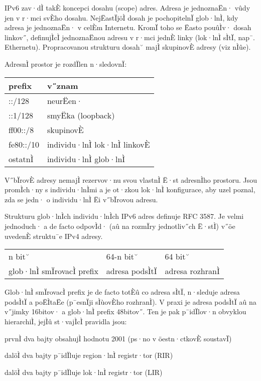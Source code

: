IPv6 zav·dÌ takÈ koncepci dosahu (scope) adres. Adresa je jednoznaËn· vûdy jen v r·mci svÈho dosahu. NejËastÏjöÌ dosah je pochopitelnÏ glob·lnÌ, kdy adresa je jednoznaËn· v celÈm Internetu. KromÏ toho se Ëasto pouûÌv· dosah linkov˝, definujÌcÌ jednoznaËnou adresu v r·mci jednÈ linky (lok·lnÌ sÌtÏ, nap¯. Ethernetu). Propracovanou strukturu dosah˘ majÌ skupinovÈ adresy (viz nÌûe).

AdresnÌ prostor je rozdÏlen n·sledovnÏ:
\begin{center}
\begin{tabular}{|l|l|}
	\hline
	prefix & v˝znam \\
	\hline
	\hline
	::/128 & neurËen· \\
	::1/128 & smyËka (loopback) \\
	ff00::/8 & skupinovÈ \\
	fe80::/10 & individu·lnÌ lok·lnÌ linkovÈ \\
	ostatnÌ & individu·lnÌ glob·lnÌ \\
	\hline
\end{tabular}
\end{center}

V˝bÏrovÈ adresy nemajÌ rezervov·nu svou vlastnÌ Ë·st adresnÌho prostoru. Jsou promÌch·ny s individu·lnÌmi a je ot·zkou lok·lnÌ konfigurace, aby uzel poznal, zda se jedn· o individu·lnÌ Ëi v˝bÏrovou adresu.

Strukturu glob·lnÌch individu·lnÌch IPv6 adres definuje RFC 3587. Je velmi jednoduch· a de facto odpovÌd· (aû na rozmÏry jednotliv˝ch Ë·stÌ) v˝öe uvedenÈ struktu¯e IPv4 adresy.

\begin{center}
\begin{tabular}{|l|l|l|}
	\hline
	n bit˘ & 64-n bit˘ & 64 bit˘ \\
	glob·lnÌ smÏrovacÌ prefix & adresa podsÌtÏ & adresa rozhranÌ \\
	\hline
\end{tabular}
\end{center}

Glob·lnÌ smÏrovacÌ prefix je de facto totÈû co adresa sÌtÏ, n·sleduje adresa podsÌtÏ a poËÌtaËe (p¯esnÏji sÌùovÈho rozhranÌ). V praxi je adresa podsÌtÏ aû na v˝jimky 16bitov· a glob·lnÌ prefix 48bitov˝. Ten je pak p¯idÏlov·n obvyklou hierarchiÌ, jejÌû st·vajÌcÌ pravidla jsou:
\begin{pitemize}
    \item prvnÌ dva bajty obsahujÌ hodnotu 2001 (ps·no v öestn·ctkovÈ soustavÏ)
    \item dalöÌ dva bajty p¯idÏluje region·lnÌ registr·tor (RIR)
    \item dalöÌ dva bajty p¯idÏluje lok·lnÌ registr·tor (LIR)
\end{pitemize}


